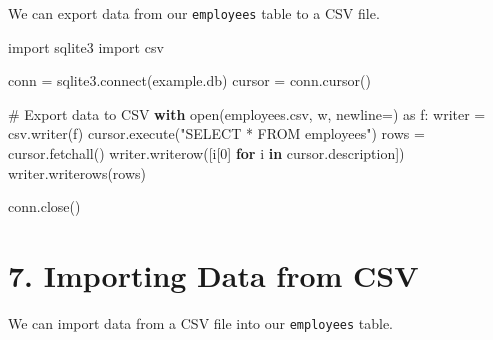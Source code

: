 \documentclass[
  letterpaper,
  DIV=11,
  numbers=noendperiod]{scrreprt}
\newenvironment{Shaded}{\begin{snugshade}}{\end{snugshade}}
\newcommand{\BuiltInTok}[1]{\textcolor[rgb]{0.00,0.23,0.31}{#1}}
\newcommand{\CommentTok}[1]{\textcolor[rgb]{0.37,0.37,0.37}{#1}}
\newcommand{\ControlFlowTok}[1]{\textcolor[rgb]{0.00,0.23,0.31}{\textbf{#1}}}
\newcommand{\DecValTok}[1]{\textcolor[rgb]{0.68,0.00,0.00}{#1}}
\newcommand{\ExtensionTok}[1]{\textcolor[rgb]{0.00,0.23,0.31}{#1}}
\newcommand{\ImportTok}[1]{\textcolor[rgb]{0.00,0.46,0.62}{#1}}
\newcommand{\KeywordTok}[1]{\textcolor[rgb]{0.00,0.23,0.31}{\textbf{#1}}}
\newcommand{\NormalTok}[1]{\textcolor[rgb]{0.00,0.23,0.31}{#1}}
\newcommand{\OperatorTok}[1]{\textcolor[rgb]{0.37,0.37,0.37}{#1}}
\newcommand{\StringTok}[1]{\textcolor[rgb]{0.13,0.47,0.30}{#1}}
\begin{document}
We can export data from our \texttt{employees} table to a CSV file.

\begin{Shaded}
\begin{Highlighting}[]
\ImportTok{import}\NormalTok{ sqlite3}
\ImportTok{import}\NormalTok{ csv}

\NormalTok{conn }\OperatorTok{=}\NormalTok{ sqlite3.}\ExtensionTok{connect}\NormalTok{(}\StringTok{\textquotesingle{}example.db\textquotesingle{}}\NormalTok{)}
\NormalTok{cursor }\OperatorTok{=}\NormalTok{ conn.cursor()}

\CommentTok{\# Export data to CSV}
\ControlFlowTok{with} \BuiltInTok{open}\NormalTok{(}\StringTok{\textquotesingle{}employees.csv\textquotesingle{}}\NormalTok{, }\StringTok{\textquotesingle{}w\textquotesingle{}}\NormalTok{, newline}\OperatorTok{=}\StringTok{\textquotesingle{}\textquotesingle{}}\NormalTok{) }\ImportTok{as}\NormalTok{ f:}
\NormalTok{    writer }\OperatorTok{=}\NormalTok{ csv.writer(f)}
\NormalTok{    cursor.execute(}\StringTok{"SELECT * FROM employees"}\NormalTok{)}
\NormalTok{    rows }\OperatorTok{=}\NormalTok{ cursor.fetchall()}
\NormalTok{    writer.writerow([i[}\DecValTok{0}\NormalTok{] }\ControlFlowTok{for}\NormalTok{ i }\KeywordTok{in}\NormalTok{ cursor.description])}
\NormalTok{    writer.writerows(rows)}

\NormalTok{conn.close()}
\end{Highlighting}
\end{Shaded}

\section{7. Importing Data from CSV}\label{importing-data-from-csv}

We can import data from a CSV file into our \texttt{employees} table.
\end{document}
